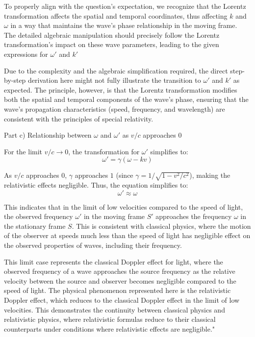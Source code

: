 To properly align with the question's expectation, we recognize that the Lorentz transformation affects the spatial and temporal coordinates, thus affecting \(k\) and \(\omega\) in a way that maintains the wave's phase relationship in the moving frame. The detailed algebraic manipulation should precisely follow the Lorentz transformation's impact on these wave parameters, leading to the given expressions for \(\omega'\) and \(k'\)

Due to the complexity and the algebraic simplification required, the direct step-by-step derivation here might not fully illustrate the transition to \(\omega'\) and \(k'\) as expected. The principle, however, is that the Lorentz transformation modifies both the spatial and temporal components of the wave's phase, ensuring that the wave's propagation characteristics (speed, frequency, and wavelength) are consistent with the principles of special relativity.

Part c) Relationship between \( \omega \) and \( \omega' \) as \( v/c \) approaches \( 0 \)

For the limit \( v/c \rightarrow 0 \), the transformation for \( \omega' \) simplifies to:
\[ \omega' = \gamma(\omega - kv) \]

As \( v/c \) approaches \( 0 \), \( \gamma \) approaches \( 1 \) (since \( \gamma = 1/\sqrt{1 - v^2/c^2} \)), making the relativistic effects negligible. Thus, the equation simplifies to:
\[ \omega' \approx \omega \]

This indicates that in the limit of low velocities compared to the speed of light, the observed frequency \( \omega' \) in the moving frame \( S' \) approaches the frequency \( \omega \) in the stationary frame \( S \). This is consistent with classical physics, where the motion of the observer at speeds much less than the speed of light has negligible effect on the observed properties of waves, including their frequency.

This limit case represents the classical Doppler effect for light, where the observed frequency of a wave approaches the source frequency as the relative velocity between the source and observer becomes negligible compared to the speed of light. The physical phenomenon represented here is the relativistic Doppler effect, which reduces to the classical Doppler effect in the limit of low velocities. This demonstrates the continuity between classical physics and relativistic physics, where relativistic formulas reduce to their classical counterparts under conditions where relativistic effects are negligible."

